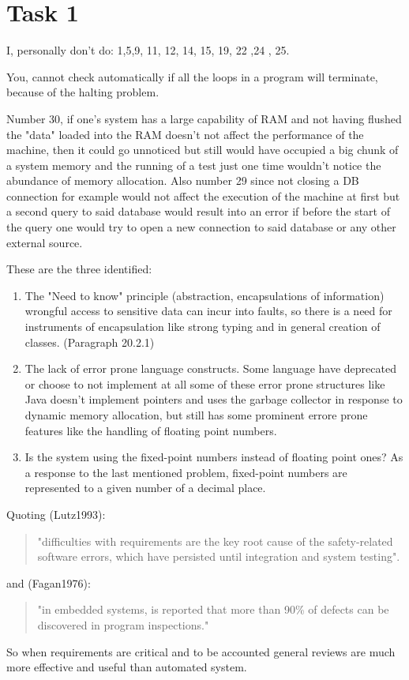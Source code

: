 \chapter{Task 1}
\begin{parlist}
	\item I, personally don't do: 1,5,9, 11, 12, 14, 15, 19, 22 ,24 , 25.
	\item You, cannot check automatically if all the loops in a program will terminate, because of the halting problem.
	\item Number 30, if one's system has a large capability of RAM and not having flushed the "data" loaded into the RAM doesn't not affect the performance of the machine, then it could go unnoticed but still would have occupied a big chunk of a system memory and the running of a test just one time wouldn't notice the abundance of memory allocation. Also number 29 since not closing a DB connection for example would not affect the execution of the machine at first but a second query to said database would result into an error if before the start of the query one would try to open a new connection to said database or any other external source.
	\item These are the three identified:
		\begin{enumerate}
			\item The "Need to know" principle (abstraction, encapsulations of information) wrongful access to sensitive data can incur into faults, so there is a need for instruments of encapsulation like strong typing and in general creation of classes. \cite{Sommerville2004}(Paragraph 20.2.1)
			\item The lack of error prone language constructs. Some language have deprecated or choose to not implement at all some of these error prone structures like Java doesn't implement pointers and uses the garbage collector in response to dynamic memory allocation, but still has some prominent errore prone features like the handling of floating point numbers. \cite{Sommerville2004}
			\item Is the system using the fixed-point numbers instead of floating point ones? As a response to the last mentioned problem, fixed-point numbers are represented to a given number of a decimal place. \cite{Sommerville2004}
		\end{enumerate}
 \newpage
	\item Quoting (Lutz1993)\cite{Lutz1993}:\begin{quotation}
			"difficulties with requirements are the key root cause of the safety-related software errors, which have persisted until integration and system testing".\end{quotation}
			and (Fagan1976)\cite{Fagan2002}:\begin{quotation}
		"in embedded systems, is reported that more than 90\% of defects can be discovered in program inspections."
			\end{quotation}
		 So when requirements are critical and to be accounted general reviews are much more effective and useful than automated system. \\
		

\end{parlist}

